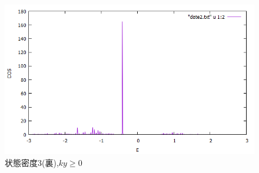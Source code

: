\documentclass{jsarticle}
\begin{document}
			\begin{figure}[H]
				\centering
				\includegraphics[scale=0.5]{LDOS3c_bry.png}
				\caption{状態密度3(裏),$ky\geq0$}
				\label{LDOS3d}
			\end{figure}
			
    
\end{document}
